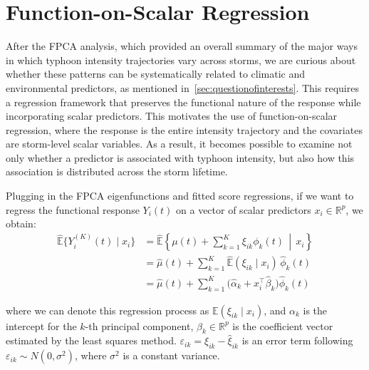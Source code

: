 \documentclass{article}
\begin{document}
\section{Function-on-Scalar Regression}
\label{sec:fosr}
After the FPCA analysis, which provided an overall summary of the major ways in which typhoon intensity trajectories vary across storms, we are curious about whether these patterns can be systematically related to climatic and environmental predictors, as mentioned in~\ref{sec:questionofinterests}. This requires a regression framework that preserves the functional nature of the response while incorporating scalar predictors. This motivates the use of function-on-scalar regression, where the response is the entire intensity trajectory and the covariates are storm-level scalar variables. As a result, it becomes possible to examine not only whether a predictor is associated with typhoon intensity, but also how this association is distributed across the storm lifetime.

Plugging in the FPCA eigenfunctions and fitted score regressions, if we want to regress the functional response $Y_i(t)$ on a vector of scalar predictors $x_i \in \mathbb{R}^p$, we obtain:
\[
\begin{aligned}
\widehat{\mathbb{E}}\{Y_i^{(K)}(t)\mid x_i\}
&= \widehat{\mathbb{E}}\!\left\{\mu(t)+\sum_{k=1}^{K}\xi_{ik}\phi_k(t)\,\middle|\,x_i\right\} \\
&= \hat\mu(t) + \sum_{k=1}^{K}\widehat{\mathbb{E}}(\xi_{ik}\mid x_i)\,\hat\phi_k(t) \\
&= \hat\mu(t) + \sum_{k=1}^{K}\bigl(\hat\alpha_k + x_i^\top \hat\beta_k\bigr)\hat\phi_k(t)
\end{aligned}
\]

where we can denote this regression process as ${\mathbb{E}}(\xi_{ik}\mid x_i)$, and $\alpha_k$ is the intercept for the $k$-th principal component,  $\beta_k \in \mathbb{R}^p$ is the coefficient vector estimated by the least squares method. $\varepsilon_{ik} = \xi_{ik} - \hat\xi_{ik}$ is an error term following $\varepsilon_{ik} \sim N(0, \sigma^2)$, where $\sigma^2$ is a constant variance.
\end{document}
